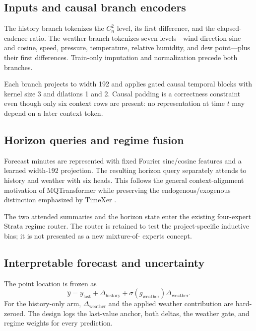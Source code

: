 \documentclass[10pt]{article}
\newcommand{\cn}{\(C_n^2\)}
\begin{document}
\subsection{Inputs and causal branch encoders}

The history branch tokenizes the \cn{} level, its first difference, and the
elapsed-cadence ratio. The weather branch tokenizes seven levels---wind
direction sine and cosine, speed, pressure, temperature, relative humidity,
and dew point---plus their first differences. Train-only imputation and
normalization precede both branches.

Each branch projects to width 192 and applies gated causal temporal blocks
with kernel size 3 and dilations 1 and 2. Causal padding is a correctness
constraint even though only six context rows are present: no representation
at time \(t\) may depend on a later context token.

\subsection{Horizon queries and regime fusion}

Forecast minutes are represented with fixed Fourier sine/cosine features and
a learned width-192 projection. The resulting horizon query separately
attends to history and weather with six heads. This follows the general
context-alignment motivation of MQTransformer \cite{eisenach2022mqtransformer}
while preserving the endogenous/exogenous distinction emphasized by TimeXer
\cite{wang2024timexer}.

The two attended summaries and the horizon state enter the existing
four-expert Strata regime router. The router is retained to test the
project-specific inductive bias; it is not presented as a new mixture-of-
experts concept.

\subsection{Interpretable forecast and uncertainty}

The point location is frozen as
\begin{equation}
\widehat y =
y_{\mathrm{last}} +
\Delta_{\mathrm{history}} +
\sigma(g_{\mathrm{weather}})\Delta_{\mathrm{weather}}.
\end{equation}
For the history-only arm,
\(\Delta_{\mathrm{weather}}\) and the applied weather contribution are
hard-zeroed. The design logs the last-value anchor, both deltas, the weather
gate, and regime weights for every prediction.
\end{document}
